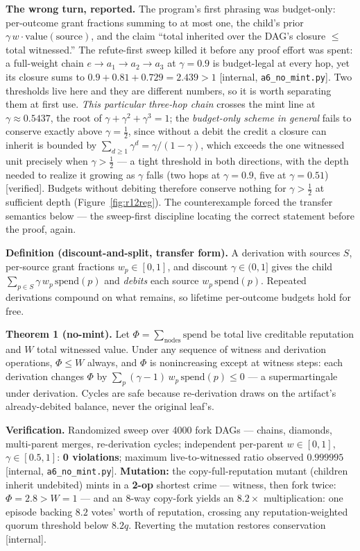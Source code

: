 \documentclass[11pt,a4paper]{article}
\begin{document}
\textbf{The wrong turn, reported.} The program's first phrasing was budget-only: per-outcome grant fractions summing to at most
one, the child's prior $\gamma\, w\cdot\mathrm{value}(\text{source})$, and the claim ``total inherited over the DAG's closure
$\le$ total witnessed.'' The refute-first sweep killed it before any proof effort was spent: a full-weight chain
$e\to a_1\to a_2\to a_3$ at $\gamma=0.9$ is budget-legal at every hop, yet its closure sums to $0.9+0.81+0.729=2.439>1$ [internal,
\texttt{a6\_\allowbreak no\_\allowbreak mint.py}]. Two thresholds live here and they are different numbers, so it is worth separating them at first use.
\emph{This particular three-hop chain} crosses the mint line at $\gamma\approx0.5437$, the root of $\gamma+\gamma^2+\gamma^3=1$;
the \emph{budget-only scheme in general} fails to conserve exactly above $\gamma=\tfrac12$, since without a debit the credit a
closure can inherit is bounded by $\sum_{d\ge1}\gamma^d=\gamma/(1-\gamma)$, which exceeds the one witnessed unit precisely when
$\gamma>\tfrac12$ --- a tight threshold in both directions, with the depth needed to realize it growing as $\gamma$ falls (two hops
at $\gamma=0.9$, five at $\gamma=0.51$) [verified]. Budgets without debiting therefore conserve nothing for $\gamma>\tfrac12$ at
sufficient depth (Figure~\ref{fig:r12reg}). The counterexample forced the transfer
semantics below --- the sweep-first discipline locating the correct statement before the proof, again.

\begin{thebox}
\textbf{Definition (discount-and-split, transfer form).} A derivation with sources $S$, per-source grant fractions $w_p\in[0,1]$,
and discount $\gamma\in(0,1]$ gives the child $\sum_{p\in S}\gamma\,w_p\,\mathrm{spend}(p)$ and \emph{debits} each source
$w_p\,\mathrm{spend}(p)$. Repeated derivations compound on what remains, so lifetime per-outcome budgets hold for free.

\textbf{Theorem 1 (no-mint).} Let $\Phi=\sum_{\text{nodes}}\mathrm{spend}$ be total live creditable reputation and $W$ total
witnessed value. Under any sequence of witness and derivation operations, $\Phi\le W$ always, and $\Phi$ is nonincreasing except at
witness steps: each derivation changes $\Phi$ by $\sum_p(\gamma-1)\,w_p\,\mathrm{spend}(p)\le 0$ --- a supermartingale under
derivation. Cycles are safe because re-derivation draws on the artifact's already-debited balance, never the original leaf's.

\textbf{Verification.} Randomized sweep over 4000 fork DAGs --- chains, diamonds, multi-parent merges, re-derivation cycles;
independent per-parent $w\in[0,1]$, $\gamma\in[0.5,1]$: \textbf{0 violations}; maximum live-to-witnessed ratio observed $0.999995$
[internal, \texttt{a6\_\allowbreak no\_\allowbreak mint.py}]. \textbf{Mutation:} the copy-full-reputation mutant (children inherit undebited) mints in a
\textbf{2-op} shortest crime --- witness, then fork twice: $\Phi=2.8>W=1$ --- and an 8-way copy-fork yields an $8.2\times$
multiplication: one episode backing $8.2$ votes' worth of reputation, crossing any reputation-weighted quorum threshold below
$8.2q$. Reverting the mutation restores conservation [internal].
\end{thebox}
\end{document}
